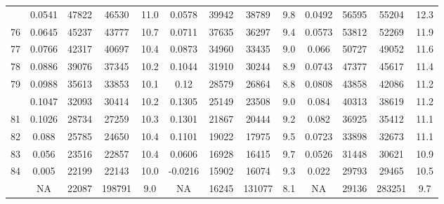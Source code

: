 \documentclass[
  14pt,
]{article}
\begin{document}
\begin{longtable}[t]{lcccccccccccc}
\addlinespace
75 & 0.0541 & 47822 & 46530 & 11.0 & 0.0578 & 39942 & 38789 & 9.8 & 0.0492 & 56595 & 55204 & 12.3\\
76 & 0.0645 & 45237 & 43777 & 10.7 & 0.0711 & 37635 & 36297 & 9.4 & 0.0573 & 53812 & 52269 & 11.9\\
77 & 0.0766 & 42317 & 40697 & 10.4 & 0.0873 & 34960 & 33435 & 9.0 & 0.066 & 50727 & 49052 & 11.6\\
78 & 0.0886 & 39076 & 37345 & 10.2 & 0.1044 & 31910 & 30244 & 8.9 & 0.0743 & 47377 & 45617 & 11.4\\
79 & 0.0988 & 35613 & 33853 & 10.1 & 0.12 & 28579 & 26864 & 8.8 & 0.0808 & 43858 & 42086 & 11.2\\
\addlinespace
80 & 0.1047 & 32093 & 30414 & 10.2 & 0.1305 & 25149 & 23508 & 9.0 & 0.084 & 40313 & 38619 & 11.2\\
81 & 0.1026 & 28734 & 27259 & 10.3 & 0.1301 & 21867 & 20444 & 9.2 & 0.082 & 36925 & 35412 & 11.1\\
82 & 0.088 & 25785 & 24650 & 10.4 & 0.1101 & 19022 & 17975 & 9.5 & 0.0723 & 33898 & 32673 & 11.1\\
83 & 0.056 & 23516 & 22857 & 10.4 & 0.0606 & 16928 & 16415 & 9.7 & 0.0526 & 31448 & 30621 & 10.9\\
84 & 0.005 & 22199 & 22143 & 10.0 & -0.0216 & 15902 & 16074 & 9.3 & 0.022 & 29793 & 29465 & 10.5\\
\addlinespace
85 & NA & 22087 & 198791 & 9.0 & NA & 16245 & 131077 & 8.1 & NA & 29136 & 283251 & 9.7\\*
\end{longtable}
\end{document}
